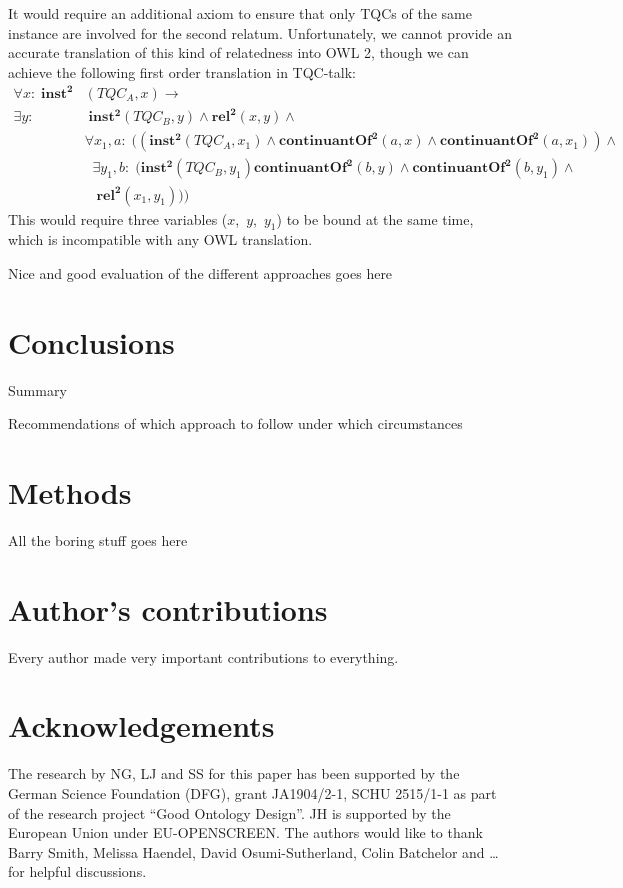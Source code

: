 \documentclass[10pt]{bmc_article}
\newcommand{\mirel}[1]{\ensuremath{\mathrm{\mathbf{#1}}}}
\newcommand{\mclass}[1]{\ensuremath{\mathit{#1}}}
\newcommand{\mrel}[2]{\mirel{#1^#2}}
\newcommand{\mrelb}[1]{\mrel{#1}{2}}
\newcommand{\TQC}[1]{\ensuremath{TQC_{\mclass{#1}}}}
\newenvironment{bmcformat}{\baselineskip20pt\sloppy\setboolean{publ}{false}}{\baselineskip20pt\sloppy}
\begin{document}
\begin{bmcformat}
It would require an additional axiom to ensure that only TQCs of the same instance are involved
for the second relatum. Unfortunately, we cannot provide an
accurate translation of this kind of relatedness into OWL 2, though we can
achieve the following first order translation in TQC-talk:
 \begin{equation}
\begin{split}
\forall x:\; \mrelb{inst}&(\TQC{A},x) \rightarrow \\
 \exists y:&\;\mrelb{inst}(\TQC{B},y) \wedge \mrelb{rel}(x,y)\wedge\\
 & \forall x_1,a:\; ((\mrelb{inst}(\TQC{A},x_1) \wedge 
\mrelb{continuantOf}(a,x) \wedge \mrelb{continuantOf}(a,x_1))\wedge\\
&\;\;\exists y_1,b:\;(\mrelb{inst}(\TQC{B},y_1) \mrelb{continuantOf}(b,y)  
\wedge \mrelb{continuantOf}(b,y_1) \wedge\\&\;\;\;\mrelb{rel}(x_1,y_1)))
\end{split}
\end{equation}
This would require three variables ($x$,~$y$,~$y_1$) to be bound at the same
time, which is incompatible with any OWL translation.


Nice and good evaluation of the different approaches goes here

\section*{Conclusions}

Summary

Recommendations of which approach to follow under which circumstances


\section*{Methods}

All the boring stuff goes here

\bigskip

\section*{Author's contributions}
Every author made very important contributions to everything. 

    

\section*{Acknowledgements}
The research by NG, LJ and SS for this paper has been supported by the German
Science Foundation (DFG), grant JA1904/2-1, SCHU 2515/1-1 as part of the research project ``Good Ontology Design''.
JH is supported by the European Union under EU-OPENSCREEN. The authors would like to thank Barry Smith, 
Melissa Haendel, David Osumi-Sutherland, Colin Batchelor and \ldots for helpful discussions.


\end{bmcformat}
\end{document}
